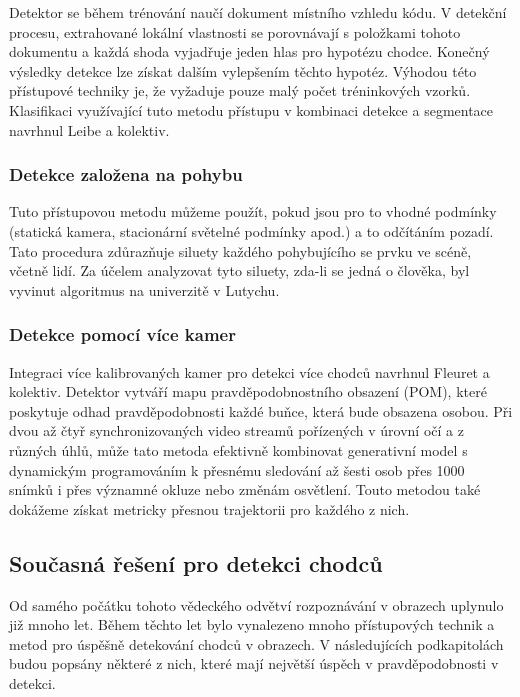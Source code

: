 Detektor se během trénování naučí dokument místního vzhledu kódu. V detekční procesu, extrahované lokální vlastnosti se porovnávají s položkami tohoto dokumentu a každá shoda vyjadřuje jeden hlas pro hypotézu chodce. Konečný výsledky detekce lze získat dalším vylepšením těchto hypotéz. Výhodou této přístupové techniky je, že vyžaduje pouze malý počet tréninkových vzorků. Klasifikaci využívající tuto metodu přístupu v kombinaci detekce a segmentace navrhnul Leibe a kolektiv\cite{leibe}.

\subsubsection{Detekce založena na pohybu}

Tuto přístupovou metodu můžeme použít, pokud jsou pro to vhodné podmínky (statická kamera, stacionární světelné podmínky apod.) a to odčítáním pozadí.  Tato procedura zdůrazňuje siluety každého pohybujícího se prvku ve scéně, včetně lidí. Za účelem analyzovat tyto siluety, zda-li se jedná o člověka, byl vyvinut algoritmus na univerzitě v Lutychu\cite{motionAlg1}\cite{motionAlg2}.

\subsubsection{Detekce pomocí více kamer}

Integraci více kalibrovaných kamer pro detekci více chodců navrhnul Fleuret a kolektiv\cite{multiCameras}. Detektor vytváří mapu pravděpodobnostního obsazení (POM), které poskytuje odhad pravděpodobnosti každé buňce, která bude obsazena osobou. Při dvou až čtyř synchronizovaných video streamů pořízených v úrovní očí a z různých úhlů, může tato metoda efektivně kombinovat generativní model s dynamickým programováním k přesnému sledování až šesti osob přes 1000 snímků i přes významné okluze nebo změnám osvětlení. Touto metodou také dokážeme získat metricky přesnou trajektorii pro každého z nich.

\subsection{Současná řešení pro detekci chodců}
Od samého počátku tohoto vědeckého odvětví rozpoznávání v obrazech uplynulo již mnoho let. Během těchto let bylo vynalezeno mnoho přístupových technik a metod pro úspěšně detekování chodců v obrazech. V následujících podkapitolách budou popsány některé z nich, které mají největší úspěch v pravděpodobnosti v detekci.

